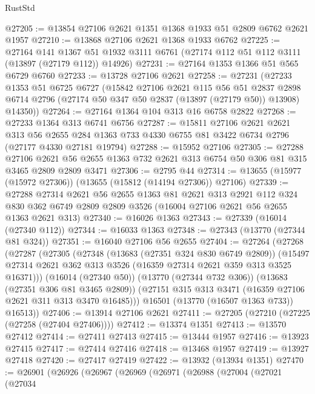 \begin{lexlean}{RustStd}
\begin{coremodule}
@27205 := @13854 @27106 @2621 @1351 @1368 @1933 @51 @2809 @6762 @2621 @1957
@27210 := @13868 @27106 @2621 @1368 @1933 @6762
@27225 := @27164
    @141
    @1367
    @51
    @1932
    @3111
    @6761
    (@27174 @112 @51 @112 @3111 (@13897 (@27179 @112)) @14926)
@27231 := @27164 @1353 @1366 @51 @565 @6729 @6760
@27233 := @13728 @27106 @2621
@27258 := @27231
    (@27233
      @1353
      @51
      @6725
      @6727
      (@15842
        @27106
        @2621
        @115
        @56
        @51
        @2837
        @2898
        @6714
        @2796
        (@27174 @50 @347 @50 @2837 (@13897 (@27179 @50)) @13908)
        @14350))
@27264 := @27164 @1364 @104 @313 @16 @6758 @2822
@27268 := @27233 @1364 @313 @6741 @6756
@27287 := @15811
    @27106
    @2621
    @2621
    @313
    @56
    @2655
    @284
    @1363
    @733
    @4330
    @6755
    @81
    @3422
    @6734
    @2796
    (@27177 @4330 @27181 @19794)
@27288 := @15952 @27106
@27305 := @27288
    @27106
    @2621
    @56
    @2655
    @1363
    @732
    @2621
    @313
    @6754
    @50
    @306
    @81
    @315
    @3465
    @2809
    @2809
    @3471
@27306 := @2795 @44
@27314 := @13655 (@15977 (@15972 @27306)) (@13655 (@15812 (@14194 @27306)) @27106)
@27339 := @27288
    @27314
    @2621
    @56
    @2655
    @1363
    @81
    @2621
    @313
    @2921
    @112
    @324
    @830
    @362
    @6749
    @2809
    @2809
    @3526
    (@16004 @27106 @2621 @56 @2655 @1363 @2621 @313)
@27340 := @16026 @1363
@27343 := @27339 (@16014 (@27340 @112))
@27344 := @16033 @1363
@27348 := @27343 (@13770 (@27344 @81 @324))
@27351 := @16040 @27106 @56 @2655
@27404 := @27264
    (@27268
      (@27287
        (@27305
          (@27348
            (@13683 (@27351 @324 @830 @6749 @2809))
            (@15497 @27314 @2621 @362 @313 @3526 (@16359 @27314 @2621 @359 @313 @3525 @16371)))
          (@16014 (@27340 @50))
          (@13770 (@27344 @732 @306))
          (@13683 (@27351 @306 @81 @3465 @2809))
          (@27151 @315 @313 @3471 (@16359 @27106 @2621 @311 @313 @3470 @16485)))
        @16501
        (@13770 (@16507 @1363 @733))
        @16513))
@27406 := @13914 @27106 @2621
@27411 := @27205 (@27210 (@27225 (@27258 (@27404 @27406))))
@27412 := @13374 @1351
@27413 := @13570 @27412
@27414 := @27411 @27413
@27415 := @13444 @1957
@27416 := @13923 @27415
@27417 := @27414 @27416
@27418 := @13468 @1957
@27419 := @13927 @27418
@27420 := @27417 @27419
@27422 := @13932 (@13934 @1351)
@27470 := @26901
    (@26926
      (@26967
        (@26969
          (@26971
            (@26988
              (@27004
                (@27021
                  (@27034

\end{coremodule}
\end{lexlean}
